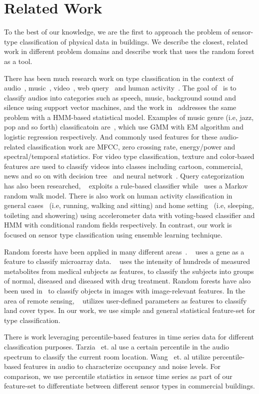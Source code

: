 \section{Related Work}
To the best of our knowledge, we are the first to approach the problem of sensor-type classification of physical data in buildings.
  We describe the closest, related work in different problem domains and describe work that uses the random forest as a tool.

There has been much research work on type classification in the context of audio~\cite{audio1,audio2}, music~\cite{music1,music2}, video~\cite{video1,video2}, 
web query~\cite{query1,query2} and human activity~\cite{activity1, activity2}. The goal of~\cite{audio1} is to classify audios into categories such as speech, 
music, background sound and silence using support vector machines, and the work in~\cite{audio2} addresses the same problem with a HMM-based statistical model. 
Examples of music genre (i.e, jazz, pop and so forth) classificatoin are~\cite{music1,music2}, which use GMM with EM algorithm and logistic regression
respectively. And commonly used features for these audio-related classification work are MFCC, zero crossing rate, energy/power and spectral/temporal statistics. 
For video type classification, texture and color-based features are used to classify videos into classes including cartoon, commercial, news and so on 
with decision tree~\cite{video1} and neural network~\cite{video2}. Query categorization has also been researched, ~\cite{query1} exploits a rule-based classifier
while~\cite{query2} uses a Markov random walk model. There is also work on human activity classification in general cases~\cite{activity1} (i.e, running, walking 
and sitting) and home setting~\cite{activity2} (i.e, sleeping, toileting and showering) using accelerometer data with voting-based classifier and HMM with 
conditional random fields respectively. In contrast, our work is focused on sensor type classification using ensemble learning technique.

Random forests have been applied in many different areas~\cite{RF1,RF2,RF3,RF4}. ~\cite{RF1} uses a gene as a feature 
to classify microarray data. ~\cite{RF2} uses the intensity of hundreds of measured metabolites from medical subjects as features, to classify the 
subjects into groups of normal, diseased and diseased with drug treatment. Random forests have also been used in~\cite{RF3} to classify 
 objects in images with image-relevant features. In the area of remote sensing, ~\cite{RF4} utilizes user-defined parameters as features 
 to classify land cover 
types. In our work, we use simple and general statistical feature-set for type classification.

There is work leveraging percentile-based features in time series data for different classification purposes. 
Tarzia~\cite{ABS} 
et. al use a certain percentile in the audio spectrum to classify the current room location. Wang~\cite{business} et. al utilize percentile-based features in audio to characterize occupancy and noise levels. For comparison, we use percentile statistics in sensor time series as 
part of our feature-set to differentiate between different sensor types in commercial buildings.
